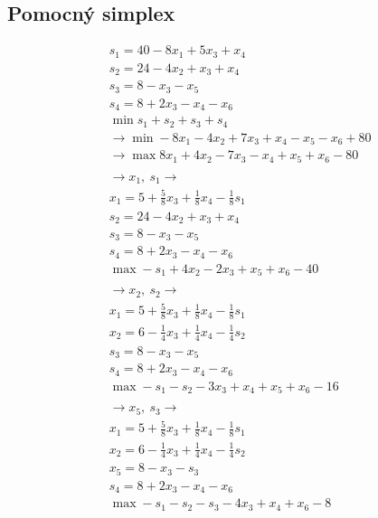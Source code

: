 \documentclass[a4paper]{article}
\begin{document}
\thispagestyle{fancy} %
{}

\subsection*{Pomocný simplex}

\begin{align*}
& s_1 = 40 - 8x_1 + 5x_3 + x_4 \\
& s_2 = 24 - 4x_2 + x_3 + x_4 \\
& s_3 = 8 - x_3 - x_5 \\
& s_4 = 8 + 2x_3 - x_4 - x_6 \\
& \min s_1 + s_2 + s_3 + s_4 \\
& \rightarrow \min -8x_1 -4x_2 +7x_3+x_4-x_5 -x_6 + 80 \\
& \rightarrow \max 8x_1 + 4x_2 - 7x_3 - x_4 + x_5 + x_6 - 80 \\
& \\
& \rightarrow x_1,\ s_1 \rightarrow \\
& x_1 = 5 + \frac{5}{8} x_3 + \frac{1}{8}x_4 - \frac{1}{8}s_1 \\
& s_2 = 24 - 4x_2 + x_3 + x_4 \\
& s_3 = 8 - x_3 - x_5 \\
& s_4 = 8 + 2x_3 - x_4 - x_6 \\
& \max -s_1 +4x_2 -2x_3 +x_5 +x_6 -40 \\
& \\
& \rightarrow x_2,\ s_2 \rightarrow \\
& x_1 = 5 + \frac{5}{8} x_3 + \frac{1}{8}x_4 - \frac{1}{8}s_1 \\
& x_2 = 6- \frac{1}{4}x_3 + \frac{1}{4}x_4 - \frac{1}{4}s_2\\
& s_3 = 8 - x_3 - x_5 \\
& s_4 = 8 + 2x_3 - x_4 - x_6 \\
& \max -s_1 - s_2 -3x_3 +x_4 +x_5+x_6 -16 \\
& \\
& \rightarrow x_5,\ s_3 \rightarrow \\
& x_1 = 5 + \frac{5}{8} x_3 + \frac{1}{8}x_4 - \frac{1}{8}s_1 \\
& x_2 = 6- \frac{1}{4}x_3 + \frac{1}{4}x_4 - \frac{1}{4}s_2\\
& x_5 = 8 - x_3 - s_3 \\
& s_4 = 8 + 2x_3 - x_4 - x_6 \\
& \max -s_1 - s_2 - s_3 - 4x_3 +x_4 +x_6 -8 \\

\end{align*}
\end{document}
